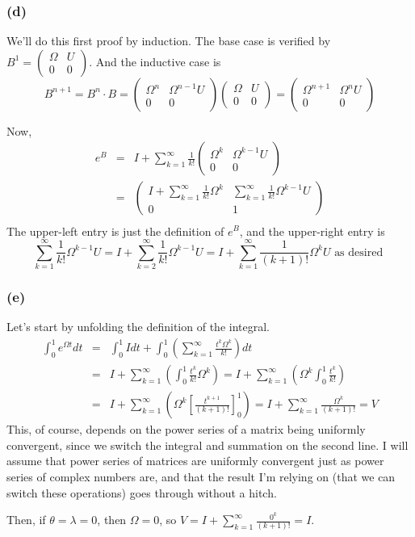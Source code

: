 \documentclass{article}
\newcommand{\twomatrix}[4]{\left(\begin{array}{cc} #1 & #2\\ #3 & #4 \end{array}\right)}
\begin{document}
\subsubsection{(d)}
We'll do this first proof by induction.
The base case is verified by $B^1 = \twomatrix{\Omega}{U}{0}{0}$. And the inductive case is
\[B^{n+1} = B^n\cdot B = \twomatrix{\Omega^n}{\Omega^{n-1} U}{0}{0} \twomatrix{\Omega}{U}{0}{0}
          = \twomatrix{\Omega^{n+1}}{ \Omega^n U}{0}{0}\]

Now, 
\begin{eqnarray*}
  e^B &=&  I + \sum_{k=1}^\infty \frac{1}{k!}\twomatrix{\Omega^k}{\Omega^{k-1}U}{0}{0}\\
  &=& \twomatrix{I + \sum_{k=1}^\infty \frac{1}{k!}\Omega^k}{\sum_{k=1}^\infty \frac{1}{k!}\Omega^{k-1}U}{0}{1}\\
\end{eqnarray*}
The upper-left entry is just the definition of $e^B$, and the upper-right entry is
\[
\sum_{k=1}^\infty \frac{1}{k!}\Omega^{k-1}U = I + \sum_{k=2}^\infty \frac{1}{k!}\Omega^{k-1}U 
= I + \sum_{k=1}^\infty \frac{1}{(k+1)!}\Omega^{k}U \text{ as desired }
\]

\subsubsection{(e)}
Let's start by unfolding the definition of the integral.
\begin{eqnarray*}
  \int_0^1 e^{\Omega t}dt &=& \int_0^1 Idt + \int_0^1 \left( \sum_{k=1}^\infty \frac{t^k\Omega^k}{k!} \right) dt\\
  &=& I + \sum_{k=1}^\infty\left( \int_0^1 \frac{t^k}{k!}\Omega^k \right)
  = I + \sum_{k=1}^\infty\left( \Omega^k \int_0^1 \frac{t^k}{k!}\right)\\
  &=&  I + \sum_{k=1}^\infty\left( \Omega^k \left[\frac{t^{k+1}}{(k+1)!}\right]_0^1\right)
  = I + \sum_{k=1}^\infty \frac{\Omega^k }{(k+1)!} = V
\end{eqnarray*}
This, of course, depends on the power series of a matrix being uniformly convergent, since we switch the integral and summation on the second line.
I will assume that power series of matrices are uniformly convergent just as power series of complex numbers are, and that the result I'm relying on (that we can switch these operations) goes through without a hitch.

Then, if $\theta = \lambda = 0$, then $\Omega = 0$, so $V = I + \sum_{k=1}^\infty \frac{0^k}{(k+1)!} = I$.
\end{document}
